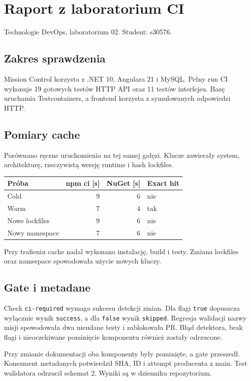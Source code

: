 \documentclass{sprz}
\begin{document}
\chapter*{Raport z laboratorium CI}
Technologie DevOps, laboratorium 02. Student: s30576.

\section*{Zakres sprawdzenia}
Mission Control korzysta z .NET 10, Angulara 21 i MySQL.
Pełny run CI wykonuje 19 gotowych testów HTTP API oraz 11 testów interfejsu.
Bazę uruchamia Testcontainers, a frontend korzysta z symulowanych odpowiedzi HTTP.

\section*{Pomiary cache}
Porównano ręczne uruchomienia na tej samej gałęzi. Klucze zawierały system,
architekturę, rzeczywistą wersję runtime i hash lockfiles.

\begin{center}
\begin{tabular}{lrrl}
\hline
Próba & npm ci [s] & NuGet [s] & Exact hit \\
\hline
Cold & 9 & 6 & nie \\
Warm & 7 & 4 & tak \\
Nowe lockfiles & 9 & 6 & nie \\
Nowy namespace & 7 & 6 & nie \\
\hline
\end{tabular}
\end{center}
Przy trafieniu cache nadal wykonano instalację, build i testy.
Zmiana lockfiles oraz namespace spowodowała użycie nowych kluczy.

\section*{Gate i metadane}
Check \texttt{ci-required} wymaga sukcesu detekcji zmian. Dla flagi
\texttt{true} dopuszcza wyłącznie wynik \texttt{success}, a dla
\texttt{false} wynik \texttt{skipped}.
Regresja walidacji nazwy misji spowodowała dwa nieudane testy i zablokowała PR.
Błąd detektora, brak flagi i nieoczekiwane pominięcie komponentu również
zostały odrzucone.

Przy zmianie dokumentacji oba komponenty były pominięte, a gate przeszedł.
Konsument metadanych potwierdził SHA, ID i attempt producenta z main.
Test walidatora odrzucił schemat 2. Wyniki są w dzienniku repozytorium.
\end{document}
